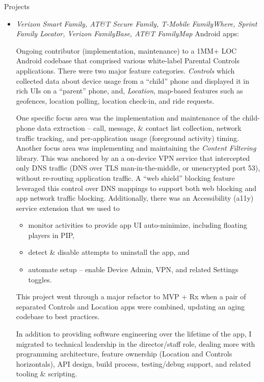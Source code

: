 
\medskip
\bigskip


\begin{bf} \large
Projects
\end{bf}
	   	   
	   \begin{itemize}
		\item 
		{\em Verizon Smart Family,
		AT\&T Secure Family, 
		T-Mobile FamilyWhere,
		Sprint Family Locator,
		Verizon FamilyBase,
		AT\&T FamilyMap} Android apps: 
		
		Ongoing contributor (implementation, maintenance) to a 1MM+ LOC Android codebase that comprised
		various white-label Parental Controls applications. There were two major feature 
		categories.  {\it Controls} which collected data about device usage from a ``child'' phone and displayed it
		in rich UIs on a ``parent'' phone, and, {\it Location}, map-based features such as geofences, location polling, 
		location check-in, and ride requests.
		
		One specific focus area was the implementation and maintenance of the child-phone data extraction -- 
		call, message, \& contact list collection, 
		network traffic tracking, and
		per-application usage (foreground activity) timing.  
		Another focus area was implementing and maintaining the {\it Content Filtering} library.  
		This was anchored by an a on-device VPN service that intercepted only
		DNS traffic (DNS over TLS man-in-the-middle, or unencrypted port 53), without re-routing application traffic.
		A ``web shield'' blocking feature leveraged
		this control over DNS mappings to support both web blocking and app network traffic blocking.  Additionally,
		there was an Accessibility (a11y) service extension that we used to 
		\begin{itemize}
		\item monitor activities to provide app UI auto-minimize, including floating players in PIP,
		\item detect \& disable attempts to uninstall the app, and
		\item automate setup -- enable Device Admin, VPN, and related Settings toggles.
		\end{itemize}
		
		This project went through a major refactor to MVP + Rx when a pair of separated Controls and Location
		apps were combined, updating an aging codebase to best practices.  
		
		In addition to providing software engineering over the lifetime of the app, 
		I migrated to technical leadership in the director/staff role, dealing more with
		programming architecture, 
		feature ownership (Location and Controls horizontals), API design,
		build process, testing/debug support, and related tooling \& scripting.  
		\\[-16pt]
		

\end{itemize}
